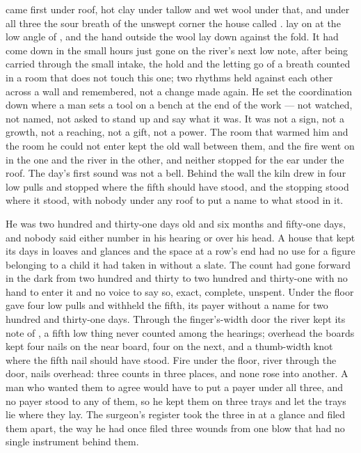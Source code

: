 
 came first under  roof, hot clay under tallow and wet wool under that, and under all three the sour  breath of the unswept corner the house called .  lay on  at the low angle of , and the hand outside the wool lay down against the fold. It had come down in the small hours just gone on the river's next low note, after being carried through the small intake, the hold and the letting go of a breath counted in a room that does not touch this one; two rhythms held against each other across a wall and remembered, not a change made again. He set the coordination down where a man sets a tool on a bench at the end of the work --- not watched, not named, not asked to stand up and say what it was. It was not a sign, not a growth, not a reaching, not a gift, not a power. The room that warmed him and the room he could not enter kept the old wall between them, and the fire went on in the one and the river in the other, and neither stopped for the ear under the roof. The day's first sound was not a bell. Behind the wall the kiln drew in four low pulls and stopped where the fifth should have stood, and the stopping stood where it stood, with nobody under any roof to put a name to what stood in it.

He was two hundred and thirty-one days old and six months and fifty-one days, and nobody said either number in his hearing or over his head. A house that kept its days in loaves and glances and the space at a row's end had no use for a figure belonging to a child it had taken in without a slate. The count had gone forward in the dark from two hundred and thirty to two hundred and thirty-one with no hand to enter it and no voice to say so, exact, complete, unspent. Under the floor  gave four low pulls and withheld the fifth, its payer without a name for two hundred and thirty-one days. Through the finger's-width door the river kept its note of , a fifth low thing never counted among the hearings; overhead the boards kept four nails on the near board, four on the next, and a thumb-width knot where the fifth nail should have stood. Fire under the floor, river through the door, nails overhead: three counts in three places, and none rose into another. A man who wanted them to agree would have to put a payer under all three, and no payer stood to any of them, so he kept them on three trays and let the trays lie where they lay. The surgeon's register took the three in at a glance and filed them apart, the way he had once filed three wounds from one blow that had no single instrument behind them.


